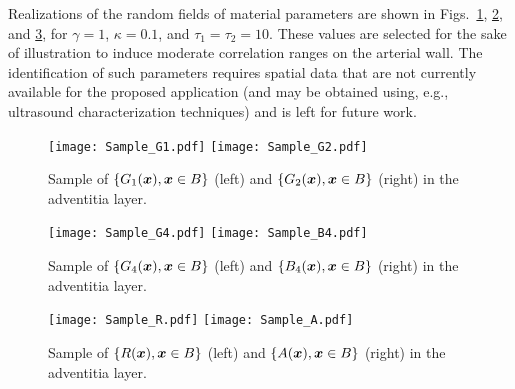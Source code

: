 Realizations of the random fields of material parameters are shown in Figs.~\ref{fig:samples-1}, \ref{fig:samples-2}, and \ref{fig:samples-3}, for $\gamma = 1$, $\kappa = 0.1$, and $\tau_1 = \tau_2 = 10$. These values are selected for the sake of illustration to induce moderate correlation ranges on the arterial wall. The identification of such parameters requires spatial data that are not currently available for the proposed application (and may be obtained using, e.g., ultrasound characterization techniques) and is left for future work.
\begin{figure}[ht!]
    \begin{center}
        
    \texttt{[image: Sample\_G1.pdf]} \texttt{[image: Sample\_G2.pdf]}
    \end{center}
    \caption[Sample of $\{G_1(\bfx), \bfx \in B\}$ and $\{G_2(\bfx), \bfx \in B\}$ in the adventitia layer.]{Sample of $\{G_1(\bfx), \bfx \in B\}$ (left) and $\{G_2(\bfx), \bfx \in B\}$ (right) in the adventitia layer.}
    \label{fig:samples-1}
\end{figure}

\begin{figure}[ht!]
    \begin{center}
        \texttt{[image: Sample\_G4.pdf]} \texttt{[image: Sample\_B4.pdf]}
    \end{center}
    \caption[Sample of $\{G_4(\bfx), \bfx \in B\}$ and $\{B_4(\bfx), \bfx \in B\}$ in the adventitia layer.]{Sample of $\{G_4(\bfx), \bfx \in B\}$ (left) and $\{B_4(\bfx), \bfx \in B\}$ (right) in the adventitia layer.}
    \label{fig:samples-2}
\end{figure}

\begin{figure}[ht!]
    \begin{center}
        \texttt{[image: Sample\_R.pdf]} \texttt{[image: Sample\_A.pdf]}
    \end{center}
    \caption[Sample of $\{R(\bfx), \bfx \in B\}$ and $\{A(\bfx), \bfx \in B\}$ in the adventitia layer.]{Sample of $\{R(\bfx), \bfx \in B\}$ (left) and $\{A(\bfx), \bfx \in B\}$ (right) in the adventitia layer.}
    \label{fig:samples-3}
\end{figure}

